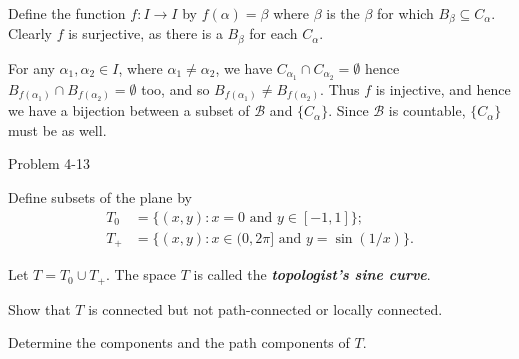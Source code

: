 \documentclass[minion]{homework651}
\newcommand{\nextprob}{\newpage}
\newcommand{\ra}{\rightarrow}
\newcommand{\calB}{\mathcal{B}}
\begin{document}
\begin{aproblems}
Define the function $f:I\ra I$ by $f(\alpha)=\beta$ where 
$\beta$ is the $\beta$ for which $B_\beta\subseteq C_\alpha$.  Clearly
$f$ is surjective, as there is a $B_\beta$ for each $C_\alpha$.

For any $\alpha_1,\alpha_2 \in I$, where $\alpha_1\ne\alpha_2$,
we have $C_{\alpha_1} \cap C_{\alpha_2} = \emptyset$ hence
$B_{f(\alpha_1)} \cap B_{f(\alpha_2)} = \emptyset$ too,
and so $B_{f(\alpha_1)} \ne B_{f(\alpha_2)}$.
Thus $f$ is injective, and hence we have a bijection between a
subset of $\calB$ and 
$\{C_\alpha\}$.  Since $\calB$ is countable, $\{C_\alpha\}$
must be as well.

\nextprob
\hproblem Problem 4-13

Define subsets of the plane by
\begin{align*}
T_0 &= \{(x,y) : x=0 \text{ and } y\in[-1,1]\}; \\
T_+ &= \{(x,y) : x\in(0,2\pi] \text{ and } y=\sin(1/x)\}.
\end{align*}

Let $T = T_0\cup T_+$.
The space $T$ is called the \textbf{\emph{topologist's sine curve}}.

\begin{subproblems}
\item Show that $T$ is connected but not path-connected or locally connected.
\item Determine the components and the path components of $T$.
\end{subproblems}

\begin{center}
\end{center}

\subsol

\subsol

\end{aproblems}
\end{document}
